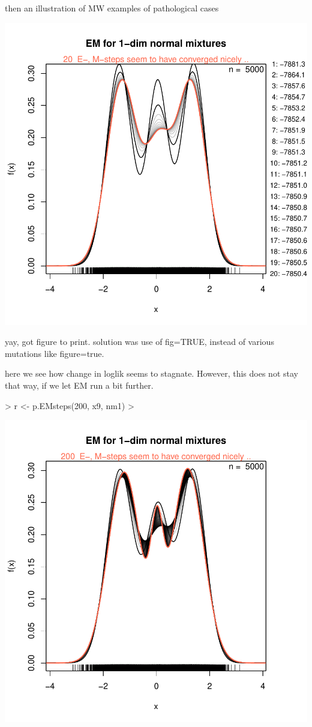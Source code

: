 then an illustration of MW examples of pathological cases


\includegraphics{chapter1-002}


yay, got figure to print. solution was use of fig=TRUE, instead of various mutations like figure=true.

here we see how change in loglik seems to stagnate. However, this does not stay that way, if we let EM run a bit further.

\begin{Schunk}
\begin{Sinput}
> r <- p.EMsteps(200, x9, nm1)
> 
\end{Sinput}
\end{Schunk}
\includegraphics{chapter1-003}

